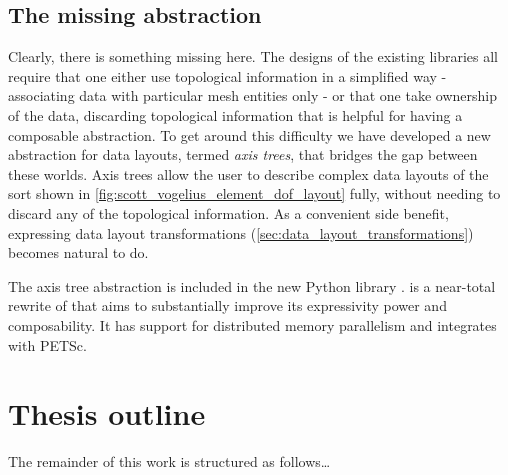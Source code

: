 \documentclass[thesis]{subfiles}
\begin{document}

\subsection{The missing abstraction}

Clearly, there is something missing here.
The designs of the existing libraries all require that one either use topological information in a simplified way - associating data with particular mesh entities only - or that one take ownership of the data, discarding topological information that is helpful for having a composable abstraction.
To get around this difficulty we have developed a new abstraction for data layouts, termed \textit{axis trees}, that bridges the gap between these worlds.
Axis trees allow the user to describe complex data layouts of the sort shown in \cref{fig:scott_vogelius_element_dof_layout} fully, without needing to discard any of the topological information.
As a convenient side benefit, expressing data layout transformations (\cref{sec:data_layout_transformations}) becomes natural to do.

The axis tree abstraction is included in the new Python library .
 is a near-total rewrite of  that aims to substantially improve its expressivity power and composability.
It has support for distributed memory parallelism and integrates with PETSc.

\section{Thesis outline}

The remainder of this work is structured as follows\dots
\end{document}
